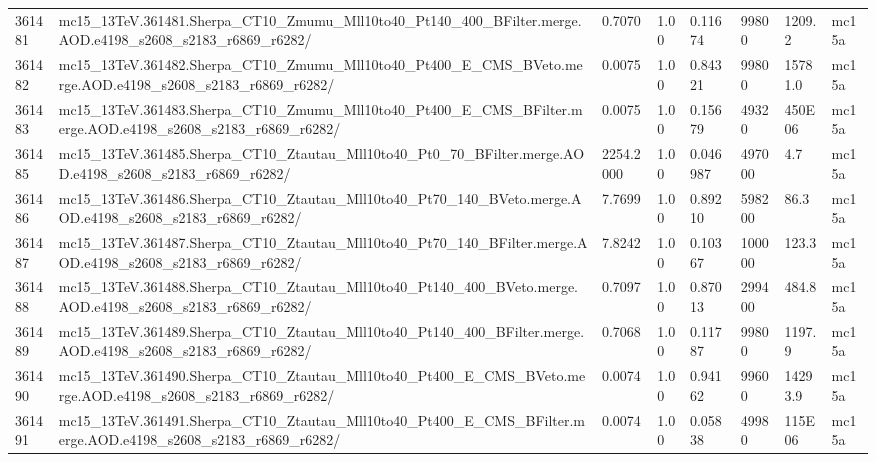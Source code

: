 \begin{sidewaystable}[!htp]
\begin{center}
{\begin{tabular}{llllllll}
361481  &  mc15\_13TeV.361481.Sherpa\_CT10\_Zmumu\_Mll10to40\_Pt140\_400\_BFilter.merge.AOD.e4198\_s2608\_s2183\_r6869\_r6282/  &  0.7070  &  1.00  &  0.11674  &  99800  &  1209.2  &  mc15a \\
361482  &  mc15\_13TeV.361482.Sherpa\_CT10\_Zmumu\_Mll10to40\_Pt400\_E\_CMS\_BVeto.merge.AOD.e4198\_s2608\_s2183\_r6869\_r6282/  &  0.0075  &  1.00  &  0.84321  &  99800  &  15781.0  &  mc15a \\
361483  &  mc15\_13TeV.361483.Sherpa\_CT10\_Zmumu\_Mll10to40\_Pt400\_E\_CMS\_BFilter.merge.AOD.e4198\_s2608\_s2183\_r6869\_r6282/  &  0.0075  &  1.00  &  0.15679   &  49320  & 450E06 &  mc15a \\
361485  &  mc15\_13TeV.361485.Sherpa\_CT10\_Ztautau\_Mll10to40\_Pt0\_70\_BFilter.merge.AOD.e4198\_s2608\_s2183\_r6869\_r6282/  &  2254.2000  &  1.00  &  0.046987  &  497000  &  4.7  &  mc15a \\
361486  &  mc15\_13TeV.361486.Sherpa\_CT10\_Ztautau\_Mll10to40\_Pt70\_140\_BVeto.merge.AOD.e4198\_s2608\_s2183\_r6869\_r6282/  &  7.7699  &  1.00  &  0.89210  &  598200  &  86.3  &  mc15a \\
361487  &  mc15\_13TeV.361487.Sherpa\_CT10\_Ztautau\_Mll10to40\_Pt70\_140\_BFilter.merge.AOD.e4198\_s2608\_s2183\_r6869\_r6282/  &  7.8242  &  1.00  &  0.10367  &  100000  &  123.3  &  mc15a \\
361488  &  mc15\_13TeV.361488.Sherpa\_CT10\_Ztautau\_Mll10to40\_Pt140\_400\_BVeto.merge.AOD.e4198\_s2608\_s2183\_r6869\_r6282/  &  0.7097  &  1.00  &  0.87013  &  299400  &  484.8  &  mc15a \\
361489  &  mc15\_13TeV.361489.Sherpa\_CT10\_Ztautau\_Mll10to40\_Pt140\_400\_BFilter.merge.AOD.e4198\_s2608\_s2183\_r6869\_r6282/  &  0.7068  &  1.00  &  0.11787  &  99800  &  1197.9  &  mc15a \\
361490  &  mc15\_13TeV.361490.Sherpa\_CT10\_Ztautau\_Mll10to40\_Pt400\_E\_CMS\_BVeto.merge.AOD.e4198\_s2608\_s2183\_r6869\_r6282/  &  0.0074  &  1.00  &  0.94162  &  99600  &  14293.9  &  mc15a \\
361491  &  mc15\_13TeV.361491.Sherpa\_CT10\_Ztautau\_Mll10to40\_Pt400\_E\_CMS\_BFilter.merge.AOD.e4198\_s2608\_s2183\_r6869\_r6282/  &  0.0074  &  1.00  &  0.05838  &  49980  &  115E06 &  mc15a \\


\hline


\end{tabular}}
\end{center}
\end{sidewaystable}
